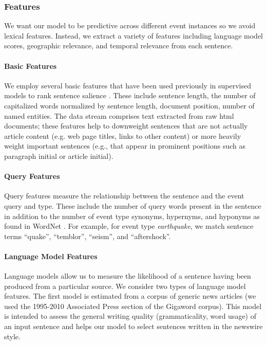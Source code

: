 

\subsubsection{Features}
\label{sec:features}
We want our model to be predictive across different event instances so we avoid lexical features.  Instead, we extract a variety of features including language model scores, geographic relevance, and temporal relevance from each sentence.  

\paragraph{Basic Features}
We employ several basic features that have been used previously in supervised models to rank sentence salience \cite{kupiec1995trainable,conroy2001using}. These include sentence length, the number of capitalized words normalized by sentence length, document position, number of named entities.  
The data stream comprises text extracted from raw html documents;
these features help to downweight sentences that are not actually article 
content (e.g. web page titles, links to other content) or
more heavily weight important sentences (e.g., that appear in
prominent positions such as paragraph initial or article initial).

\paragraph{Query Features}

Query features measure the relationship between the sentence and the event query and type.  These include the number of query words present in the sentence in addition to the number of event type synonyms, hypernyms, and hyponyms as found in WordNet \cite{miller1995wordnet}.  
For example, for event type \emph{earthquake},  we match sentence terms 
``quake'', ``temblor'', ``seism'', and ``aftershock''.

\paragraph{Language Model Features}\label{subsubsec:lm}
Language models allow us to measure the likelihood of a sentence having been 
produced from a particular source.  We consider two types of language model 
features.  The first model is estimated from a corpus of generic news 
articles (we used the 1995-2010 Associated Press section of the 
Gigaword corpus).  
This model is intended to assess the general writing quality (grammaticality, word usage) of an input sentence and helps our model to select sentences
written in the newswire style.  

